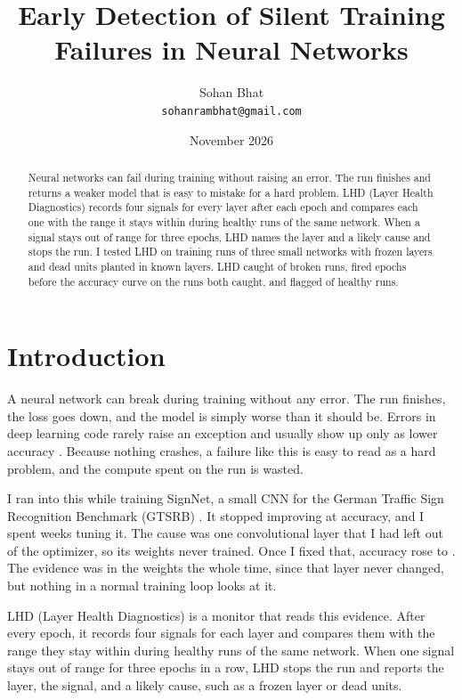 \documentclass[11pt]{article}
\title{Early Detection of Silent Training Failures in Neural Networks}
\author{Sohan Bhat\\ \small \texttt{sohanrambhat@gmail.com}}
\date{November 2026}
\begin{document}
\maketitle

\begin{abstract}
Neural networks can fail during training without raising an error. The run finishes and returns a weaker model that is easy to mistake for a hard problem. LHD (Layer Health Diagnostics) records four signals for every layer after each epoch and compares each one with the range it stays within during healthy runs of the same network. When a signal stays out of range for three epochs, LHD names the layer and a likely cause and stops the run. I tested LHD on \lhdRuns{} training runs of three small networks with frozen layers and dead units planted in known layers. LHD caught \lhdCaughtRate{} of \lhdBrokenRuns{} broken runs, fired \lhdBothGap{} epochs before the accuracy curve on the runs both caught, and flagged \lhdFalseAlarms{} of \lhdHealthyRuns{} healthy runs.
\end{abstract}

\section{Introduction}
\label{sec:intro}

A neural network can break during training without any error. The run finishes, the loss goes down, and the model is simply worse than it should be. Errors in deep learning code rarely raise an exception and usually show up only as lower accuracy \citep{chwilczynski2024}. Because nothing crashes, a failure like this is easy to read as a hard problem, and the compute spent on the run is wasted.

I ran into this while training SignNet, a small CNN for the German Traffic Sign Recognition Benchmark (GTSRB) \citep{stallkamp2012}. It stopped improving at \lhdStoryBefore{} accuracy, and I spent weeks tuning it. The cause was one convolutional layer that I had left out of the optimizer, so its weights never trained. Once I fixed that, accuracy rose to \lhdStoryAfter{}. The evidence was in the weights the whole time, since that layer never changed, but nothing in a normal training loop looks at it.

LHD (Layer Health Diagnostics) is a monitor that reads this evidence. After every epoch, it records four signals for each layer and compares them with the range they stay within during healthy runs of the same network. When one signal stays out of range for three epochs in a row, LHD stops the run and reports the layer, the signal, and a likely cause, such as a frozen layer or dead units.
\end{document}
